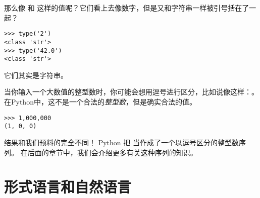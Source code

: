 
那么像  和  这样的值呢？它们看上去像数字，但是又和字符串一样被引号括在了一起？
  

\begin{lstlisting}
>>> type('2')
<class 'str'>
>>> type('42.0')
<class 'str'>
\end{lstlisting}

%

它们其实是字符串。


当你输入一个大数值的整型数时，你可能会想用逗号进行区分，比如说像这样：。 在Python中，这不是一个合法的{\em 整型数}，但是确实合法的值。

\begin{lstlisting}
>>> 1,000,000
(1, 0, 0)
\end{lstlisting}
%

结果和我们预料的完全不同！ Python 把  当作成了一个以逗号区分的整型数序列。 在后面的章节中，我们会介绍更多有关这种序列的知识。



\section{形式语言和自然语言}
  
  
  
  


